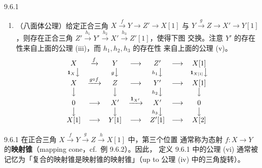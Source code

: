 \begin{wdefn}{9.6.1}
\begin{enumerate}[label=(\roman*)]
\[\begin{array}{ccccccc}
        X' & \xrightarrow{f'} & Y' & \longrightarrow & Z' & \longrightarrow & X'[1]
        \end{array}
        \]
  \item （八面体公理）给定正合三角
        $X\xrightarrow{f}Y\to Z'\to X[1]$ 与
        $Y\xrightarrow{g}Z\to X'\to Y[1]$，则存在正合三角
        $Z'\xrightarrow{h_1}Y'\xrightarrow{h_2}X'\xrightarrow{h_3}Z'[1]$，使得下图
        交换。注意 $Y'$ 的存在性来自上面的公理 (iii)，而 $h_1,h_2,h_3$ 的存在性
        来自上面的公理 (v)。
        \[
        \begin{array}{ccccccc}
        X & \xrightarrow{f} & Y & \longrightarrow & Z' & \longrightarrow & X[1]\\
        {\scriptstyle\mathbf 1_X}\big\downarrow & &
        {\scriptstyle g}\big\downarrow & &
        {\scriptstyle h_1}\big\downarrow & &
        {\scriptstyle\mathbf 1_{X[1]}}\big\downarrow\\
        X & \xrightarrow{g\circ f} & Z & \longrightarrow & Y' & \longrightarrow & X[1]\\
        \big\downarrow & & \big\downarrow & &
        {\scriptstyle h_2}\big\downarrow & & \big\downarrow\\
        0 & \longrightarrow & X' & \xrightarrow{\mathbf 1_{X'}} & X' & \longrightarrow & 0\\
        \big\downarrow & & \big\downarrow & &
        {\scriptstyle h_3}\big\downarrow & & \big\downarrow\\
        X[1] & \longrightarrow & Y[1] & \longrightarrow & Z'[1] & \longrightarrow & X[2]
        \end{array}
        \]
\end{enumerate}
\end{wdefn}


\begin{wrem}{9.6.1}
在正合三角 $X\xrightarrow{f}Y\xrightarrow{g}Z\xrightarrow{h}X[1]$ 中，第三个位置
通常称为态射 $f:X\to Y$ 的\textbf{映射锥}（mapping cone，cf.\ 例 9.6.2）。因此，
定义 9.6.1 中的公理 (vi) 通常被记忆为「复合的映射锥是映射锥的映射锥」（up to 公理
(iv) 中的三角旋转）。
\end{wrem}


